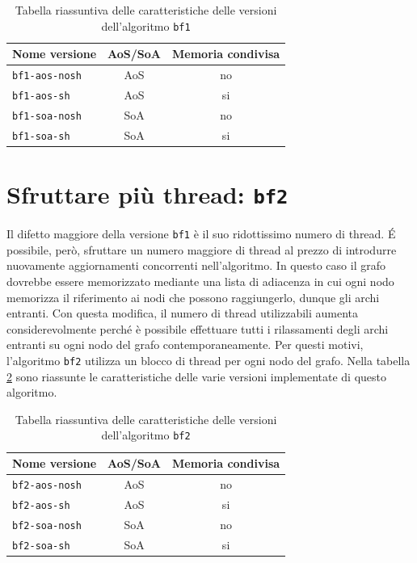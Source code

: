 \documentclass[12pt,a4paper,oneside]{book}
\begin{document}
	\begin{table}[!ht]
		\centering
		\begin{tabular}{|l|c|c|}
			\hline
			\textbf{Nome versione} & \textbf{AoS/SoA} & \textbf{Memoria condivisa} \\ \hline
			\texttt{bf1-aos-nosh}  & AoS & no \\ \hline
			\texttt{bf1-aos-sh}    & AoS & si \\ \hline
			\texttt{bf1-soa-nosh}  & SoA & no \\ \hline
			\texttt{bf1-soa-sh}    & SoA & si \\ \hline
		\end{tabular}
		\caption{Tabella riassuntiva delle caratteristiche delle versioni dell'algoritmo \texttt{bf1}}
		\label{tab:riassunto_bf1}
	\end{table}
	
	\section{Sfruttare più thread: \texttt{bf2}}
	\label{section:intro-bf2}
	Il difetto maggiore della versione \texttt{bf1} è il suo ridottissimo numero di thread. \'E possibile, però, sfruttare un numero maggiore di thread al prezzo di introdurre nuovamente aggiornamenti concorrenti nell'algoritmo. In questo caso il grafo dovrebbe essere memorizzato mediante una lista di adiacenza in cui ogni nodo memorizza il riferimento ai nodi che possono raggiungerlo, dunque gli archi entranti. Con questa modifica, il numero di thread utilizzabili aumenta considerevolmente perché è possibile effettuare tutti i rilassamenti degli archi entranti su ogni nodo del grafo contemporaneamente. Per questi motivi, l'algoritmo \texttt{bf2} utilizza un blocco di thread per ogni nodo del grafo. Nella tabella \ref{tab:riassunto_bf2} sono riassunte le caratteristiche delle varie versioni implementate di questo algoritmo.

	\begin{table}[!ht]
		\centering
		\begin{tabular}{|l|c|c|}
			\hline
			\textbf{Nome versione} & \textbf{AoS/SoA} & \textbf{Memoria condivisa} \\ \hline
			\texttt{bf2-aos-nosh}  & AoS & no \\ \hline
			\texttt{bf2-aos-sh}    & AoS & si \\ \hline
			\texttt{bf2-soa-nosh}  & SoA & no \\ \hline
			\texttt{bf2-soa-sh}    & SoA & si \\ \hline
		\end{tabular}
		\caption{Tabella riassuntiva delle caratteristiche delle versioni dell'algoritmo \texttt{bf2}}
		\label{tab:riassunto_bf2}
	\end{table}
	
\end{document}
